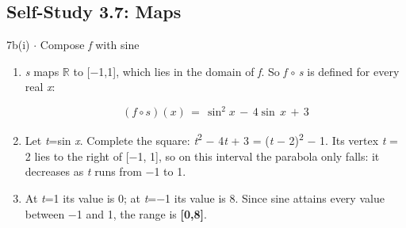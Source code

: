 \documentclass[11pt]{article}
\begin{document}
\begin{keepsection}\subsection{Self-Study 3.7: Maps}

\begin{workedbox}{7b(i) \ensuremath{\cdot} Compose \textit{f} with sine}
\begin{enumerate}
\item {}
\textit{s} maps \ensuremath{\mathbb{R}} to [\ensuremath{-}1,1], which lies in the domain of \textit{f}. So \textit{f} \ensuremath{\circ} \textit{s} is defined for every real \textit{x}:

\begin{equation*}({f}\circ {s})({x})\, =\, \sin ^{2}{x}\, -\, 4\sin \, {x}\, +\, 3\end{equation*}
\item Let \textit{t}=sin \textit{x}. Complete the square: \textit{t}\textsuperscript{2} \ensuremath{-} 4\textit{t} + 3 = (\textit{t} \ensuremath{-} 2)\textsuperscript{2} \ensuremath{-} 1. Its vertex \textit{t} = 2 lies to the right of [\ensuremath{-}1, 1], so on this interval the parabola only falls: it decreases as \textit{t} runs from \ensuremath{-}1 to 1.
\item At \textit{t}=1 its value is 0; at \textit{t}=\ensuremath{-}1 its value is 8. Since sine attains every value between \ensuremath{-}1 and 1, the range is \textbf{[0,8]}.
\end{enumerate}
\end{workedbox}

\end{keepsection}
\end{document}
